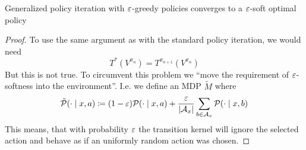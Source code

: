 \begin{prop}
	Generalized policy iteration with \(\varepsilon\)-greedy policies converges to a \(\varepsilon\)-soft optimal policy
\end{prop}
\begin{proof}
	To use the same argument as with the standard policy iteration, we would need
	\[
		T^*(V^{\pi_n})=T^{\pi_{n+1}}(V^{\pi_n})
	\]
	But this is not true. To circumvent this problem we ``move the requirement of \(\varepsilon\)-softness into the environment''. I.e. we define an MDP \(\tilde{M}\) where
	\[
		\tilde{\mathcal{P}}(\cdot \mid x,a) \coloneqq (1-\varepsilon) \mathcal{P}(\cdot \mid x,a) 
		+ \frac{\varepsilon}{|\mathcal{A}_x|}\sum_{b\in\mathcal{A}_x} \mathcal{P}(\cdot \mid x,b)
	\]
	This means, that with probability \(\varepsilon\) the transition kernel will ignore the selected action and behave as if an uniformly random action was chosen.	
	

\end{proof}
